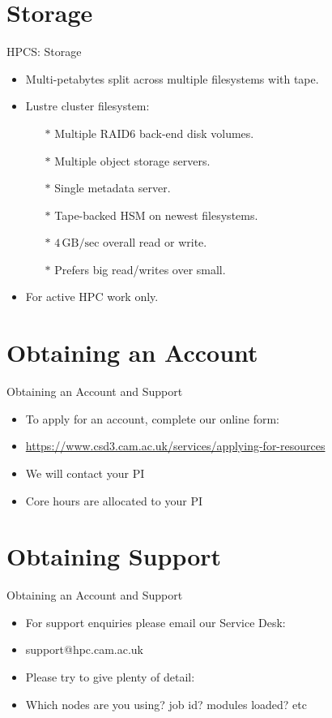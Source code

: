 \section{Storage}
\begin{frame}{HPCS: Storage}
\begin{itemize}
\item{Multi-petabytes split across multiple filesystems with tape.}
\item{Lustre cluster filesystem:}
\begin{itemize}
\item[$\ast$]{Multiple RAID6 back-end disk volumes.}
\item[$\ast$]{Multiple object storage servers.}
\item[$\ast$]{Single metadata server.}
\item[$\ast$]{Tape-backed HSM on newest filesystems.}
\pause
\item[$\ast$]{\alert{$4\,\text{GB/sec}$ overall read or write.}}
\pause
\item[$\ast$]{\alert{Prefers big read/writes over small.}}
\end{itemize}
\pause
\item{\alert{For active HPC work only.}}
\end{itemize}
\end{frame}

\section{Obtaining an Account}
\begin{frame}{Obtaining an Account and Support}
\begin{itemize}
\item{To apply for an account, complete our online form:}
\item \small {\url{https://www.csd3.cam.ac.uk/services/applying-for-resources}}
\pause
\item{We will contact your PI}
\item{Core hours are allocated to your PI}
\end{itemize}
\end{frame}

\section{Obtaining Support}
\begin{frame}{Obtaining an Account and Support}
\begin{itemize}
\item{For support enquiries please email our Service Desk:}
\item{\alert{support@hpc.cam.ac.uk}}
\item{Please try to give plenty of detail:}
\item{Which nodes are you using? job id? modules loaded? etc}
\end{itemize}
\end{frame}